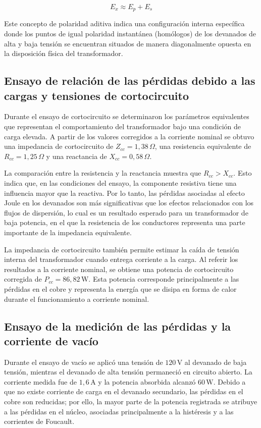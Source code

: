 \begin{equation}
    E_x \approx E_p + E_s
\end{equation}

Este concepto de polaridad aditiva indica una configuración interna específica donde los puntos de igual polaridad instantánea (homólogos) de los devanados de alta y baja tensión se encuentran situados de manera diagonalmente opuesta en la disposición física del transformador.


\subsection{Ensayo de relación de las pérdidas debido a las cargas y tensiones de cortocircuito}

Durante el ensayo de cortocircuito se determinaron los parámetros equivalentes que representan el comportamiento del transformador bajo una condición de carga elevada. A partir de los valores corregidos a la corriente nominal se obtuvo una impedancia de cortocircuito de $Z_{cc}=1,38\,\Omega$, una resistencia equivalente de $R_{cc}=1,25\,\Omega$ y una reactancia de $X_{cc}=0,58\,\Omega$.

La comparación entre la resistencia y la reactancia muestra que $R_{cc}>X_{cc}$. Esto indica que, en las condiciones del ensayo, la componente resistiva tiene una influencia mayor que la reactiva. Por lo tanto, las pérdidas asociadas al efecto Joule en los devanados son más significativas que los efectos relacionados con los flujos de dispersión, lo cual es un resultado esperado para un transformador de baja potencia, en el que la resistencia de los conductores representa una parte importante de la impedancia equivalente.

La impedancia de cortocircuito también permite estimar la caída de tensión interna del transformador cuando entrega corriente a la carga. Al referir los resultados a la corriente nominal, se obtiene una potencia de cortocircuito corregida de $P_{cc}=86,82\,\mathrm{W}$. Esta potencia corresponde principalmente a las pérdidas en el cobre y representa la energía que se disipa en forma de calor durante el funcionamiento a corriente nominal. 



\subsection{Ensayo de la medición de las pérdidas y la corriente de vacío}

Durante el ensayo de vacío se aplicó una tensión de $120\,\mathrm{V}$ al devanado de baja tensión, mientras el devanado de alta tensión permaneció en circuito abierto. La corriente medida fue de $1,6\,\mathrm{A}$ y la potencia absorbida alcanzó $60\,\mathrm{W}$. Debido a que no existe corriente de carga en el devanado secundario, las pérdidas en el cobre son reducidas; por ello, la mayor parte de la potencia registrada se atribuye a las pérdidas en el núcleo, asociadas principalmente a la histéresis y a las corrientes de Foucault.

